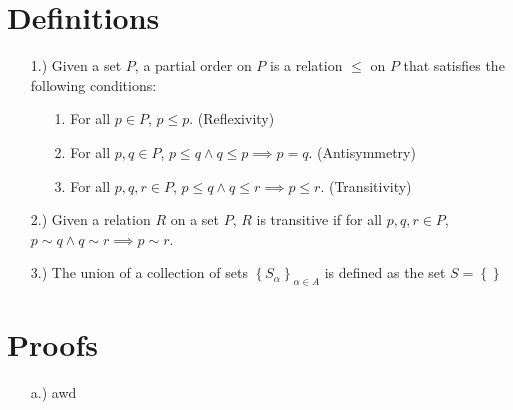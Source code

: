\documentclass[11pt]{article}
\newcommand{\braces}[1]{\left\{#1\right\}}           %
\begin{document}
\pagestyle{fancy}
\fancyhead{}

\normalsize

\section*{Definitions}
\begin{itemize}
    \item [1.)] Given a set $P$, a partial order on $P$ is a relation $\leq$ on $P$ that satisfies the following conditions:
    \begin{itemize}
        \item [1.] For all $p\in P$, $p\leq p$. (Reflexivity)
        \item [2.] For all $p,q\in P$, $p\leq q\land q\leq p\implies p=q$. (Antisymmetry)
        \item [3.] For all $p,q,r\in P$, $p\leq q\land q\leq r\implies p\leq r$. (Transitivity)
    \end{itemize}

    \item [2.)] Given a relation $R$ on a set $P$, $R$ is transitive if for all $p,q,r\in P$, $p\sim q\land q\sim r\implies p\sim r$.
    
    \item [3.)] The union of a collection of sets $\braces{S_\alpha}_{\alpha\in A}$ is defined as the set $S=\braces{}$
\end{itemize}

\section*{Proofs}
\begin{itemize}
    \item [a.)] awd
\end{itemize}
\end{document}
